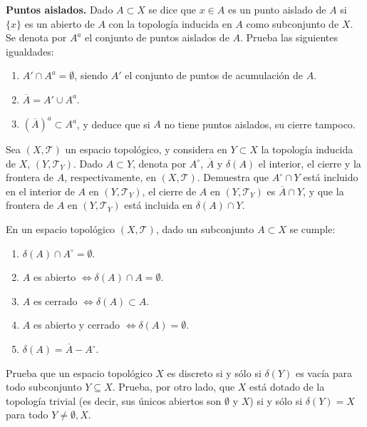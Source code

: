 \begin{ejer}[44]
\textbf{Puntos aislados.} Dado $A \subset X$ se dice que $x \in A$ es un punto aislado de $A$ si $\{x\}$ es un abierto de $A$ con la topología inducida en $A$ como subconjunto de $X$. Se denota por $A^a$ el conjunto de puntos aislados de $A$. Prueba las siguientes igualdades:
\begin{enumerate}
    \item[a)] $A' \cap A^a = \emptyset$, siendo $A'$ el conjunto de puntos de acumulación de $A$.
    \item[b)] $\overline{A} = A' \cup A^a$.
    \item[c)] $(\overline{A})^a \subset A^a$, y deduce que si $A$ no tiene puntos aislados, su cierre tampoco.
\end{enumerate}
\end{ejer}

\begin{ejer}[45]
Sea $(X, \mathcal{T})$ un espacio topológico, y considera en $Y \subset X$ la topología inducida de $X$, $(Y, \mathcal{T}_Y)$. Dado $A \subset Y$, denota por $A^\circ$, $\overline{A}$ y $\delta(A)$ el interior, el cierre y la frontera de $A$, respectivamente, en $(X, \mathcal{T})$. Demuestra que $A^\circ \cap Y$ está incluido en el interior de $A$ en $(Y, \mathcal{T}_Y)$, el cierre de $A$ en $(Y, \mathcal{T}_Y)$ es $\overline{A} \cap Y$, y que la frontera de $A$ en $(Y, \mathcal{T}_Y)$ está incluida en $\delta(A) \cap Y$.
\end{ejer}

\begin{ejer}[46]
En un espacio topológico $(X, \mathcal{T})$, dado un subconjunto $A \subset X$ se cumple:
\begin{enumerate}
    \item[a)] $\delta(A) \cap A^\circ = \emptyset$.
    \item[b)] $A$ es abierto $\Leftrightarrow \delta(A) \cap A = \emptyset$.
    \item[c)] $A$ es cerrado $\Leftrightarrow \delta(A) \subset A$.
    \item[d)] $A$ es abierto y cerrado $\Leftrightarrow \delta(A) = \emptyset$.
    \item[e)] $\delta(A) = \overline{A} - A^\circ$.
\end{enumerate}
\end{ejer}

\begin{ejer}[47]
Prueba que un espacio topológico $X$ es discreto si y sólo si $\delta(Y)$ es vacía para todo subconjunto $Y \subseteq X$. Prueba, por otro lado, que $X$ está dotado de la topología trivial (es decir, sus únicos abiertos son $\emptyset$ y $X$) si y sólo si $\delta(Y) = X$ para todo $Y \neq \emptyset, X$.
\end{ejer}

